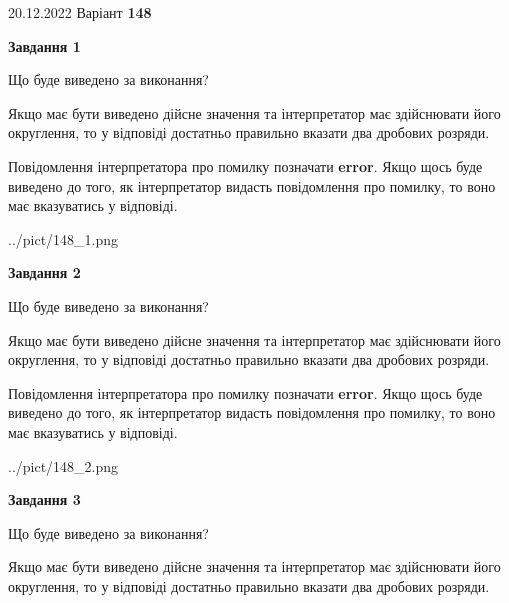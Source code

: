 \documentclass[12pt, ukrainian]{article}
\begin{document}
{20.12.2022 Варіант \No \textbf { 148 }\par}
{
\begin {Large}

{\begin {center}\textbf{Завдання 1}\end {center}}\par
Що буде виведено за виконання? \par

Якщо має бути виведено дійсне значення та інтерпретатор має здійснювати його округлення, 
то у відповіді достатньо правильно вказати два дробових розряди.

Повідомлення інтерпретатора про помилку позначати \textbf{error}.
Якщо щось буде виведено до того, як інтерпретатор видасть повідомлення про помилку, 
то воно має вказуватись у відповіді. \par

\begin{center}
	{../pict/148_1.png}
\end{center}
\newpage

{\begin {center}\textbf{Завдання 2}\end {center}}\par
Що буде виведено за виконання? \par

Якщо має бути виведено дійсне значення та інтерпретатор має здійснювати його округлення, 
то у відповіді достатньо правильно вказати два дробових розряди.

Повідомлення інтерпретатора про помилку позначати \textbf{error}.
Якщо щось буде виведено до того, як інтерпретатор видасть повідомлення про помилку, 
то воно має вказуватись у відповіді. \par

\begin{center}
	{../pict/148_2.png}
\end{center}
\newpage

{\begin {center}\textbf{Завдання 3}\end {center}}\par
Що буде виведено за виконання? \par

Якщо має бути виведено дійсне значення та інтерпретатор має здійснювати його округлення, 
то у відповіді достатньо правильно вказати два дробових розряди.


\end{Large}}
\end{document}
